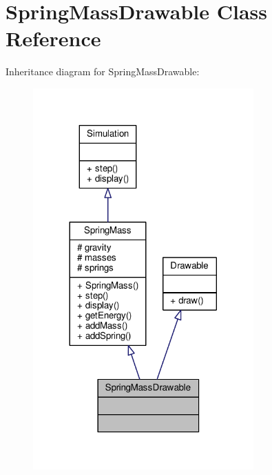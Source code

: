 \hypertarget{classSpringMassDrawable}{}\section{Spring\+Mass\+Drawable Class Reference}
\label{classSpringMassDrawable}


Inheritance diagram for Spring\+Mass\+Drawable\+:
\nopagebreak
\begin{figure}[H]
\begin{center}
\leavevmode
\includegraphics[width=240pt]{classSpringMassDrawable__inherit__graph}
\end{center}
\end{figure}



